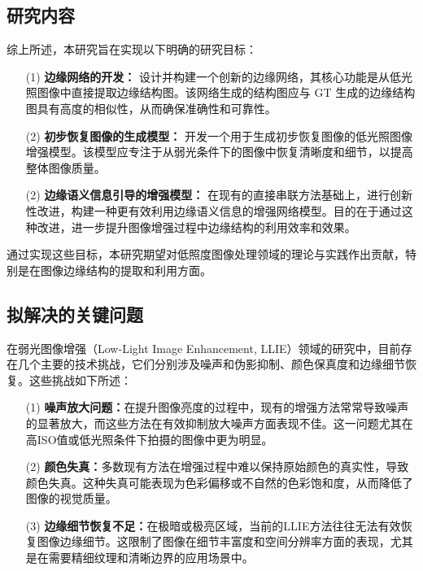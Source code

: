 \documentclass[a4paper]{ctexart}
\begin{document}
	\subsection{研究内容}
	
	综上所述，本研究旨在实现以下明确的研究目标：
	
	\begin{itemize}
		\item [(1)] \textbf{边缘网络的开发：} 设计并构建一个创新的边缘网络，其核心功能是从低光照图像中直接提取边缘结构图。该网络生成的结构图应与 GT 生成的边缘结构图具有高度的相似性，从而确保准确性和可靠性。
		
		\item [(2)] \textbf{初步恢复图像的生成模型：} 开发一个用于生成初步恢复图像的低光照图像增强模型。该模型应专注于从弱光条件下的图像中恢复清晰度和细节，以提高整体图像质量。
		
		\item [(2)] \textbf{边缘语义信息引导的增强模型：} 在现有的直接串联方法基础上，进行创新性改进，构建一种更有效利用边缘语义信息的增强网络模型。目的在于通过这种改进，进一步提升图像增强过程中边缘结构的利用效率和效果。
	\end{itemize}
	
	通过实现这些目标，本研究期望对低照度图像处理领域的理论与实践作出贡献，特别是在图像边缘结构的提取和利用方面。
	
	\subsection{拟解决的关键问题}
	
	在弱光图像增强（Low-Light Image Enhancement, LLIE）领域的研究中，目前存在几个主要的技术挑战，它们分别涉及噪声和伪影抑制、颜色保真度和边缘细节恢复。这些挑战如下所述：
	
	\begin{itemize}
		\item [(1)]
		\textbf{噪声放大问题：}在提升图像亮度的过程中，现有的增强方法常常导致噪声的显著放大，而这些方法在有效抑制放大噪声方面表现不佳。这一问题尤其在高ISO值或低光照条件下拍摄的图像中更为明显。
		\item [(2)]
		\textbf{颜色失真：}多数现有方法在增强过程中难以保持原始颜色的真实性，导致颜色失真。这种失真可能表现为色彩偏移或不自然的色彩饱和度，从而降低了图像的视觉质量。
		
		\item [(3)]
		\textbf{边缘细节恢复不足：}在极暗或极亮区域，当前的LLIE方法往往无法有效恢复图像边缘细节。这限制了图像在细节丰富度和空间分辨率方面的表现，尤其是在需要精细纹理和清晰边界的应用场景中。
		
	\end{itemize}
\end{document}
